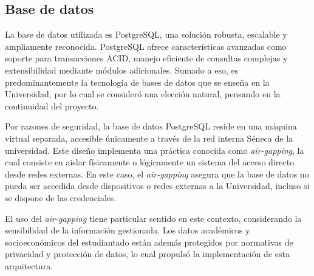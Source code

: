\subsection{Base de datos}

La base de datos utilizada es \gls{PostgreSQL}, una solución robusta, escalable y ampliamente reconocida. \gls{PostgreSQL} ofrece características avanzadas como soporte para transacciones ACID, manejo eficiente de consultas complejas y extensibilidad mediante módulos adicionales. Sumado a eso, es predominantemente la tecnología de bases de datos que se enseña en la Universidad, por lo cual se consideró una elección natural, pensando en la continuidad del proyecto.

Por razones de seguridad, la base de datos \gls{PostgreSQL} reside en una máquina virtual separada, accesible únicamente a través de la red interna Séneca de la universidad. Este diseño implementa una práctica conocida como \textit{air-gapping}, la cual consiste en aislar físicamente o lógicamente un sistema del acceso directo desde redes externas. En este caso, el \textit{air-gapping} asegura que la base de datos no pueda ser accedida desde dispositivos o redes externas a la Universidad, incluso si se dispone de las credenciales.

El uso del \textit{air-gapping} tiene particular sentido en este contexto, considerando la sensibilidad de la información gestionada. Los datos académicos y socioeconómicos del estudiantado están además protegidos por normativas de privacidad y protección de datos, lo cual propulsó la implementación de esta arquitectura.
